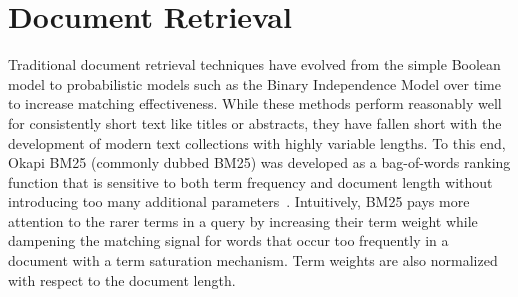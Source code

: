 
\section{Document Retrieval}
\label{non-neural-retrieval}

Traditional document retrieval techniques have evolved from the simple Boolean model to probabilistic models such as the Binary Independence Model over time to increase matching effectiveness.
While these methods perform reasonably well for consistently short text like titles or abstracts, they have fallen short with the development of modern text collections with highly variable lengths.
To this end, Okapi BM25 (commonly dubbed BM25) was developed as a bag-of-words ranking function that is sensitive to both term frequency and document length without introducing too many additional parameters~\cite{jones2000probabilistic}.
Intuitively, BM25 pays more attention to the rarer terms in a query by increasing their term weight while dampening the matching signal for words that occur too frequently in a document with a term saturation mechanism.
Term weights are also normalized with respect to the document length.

